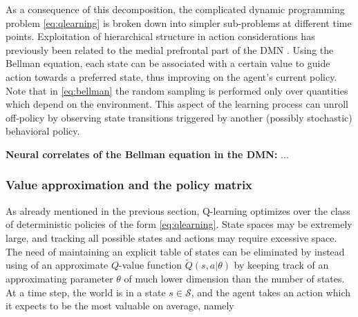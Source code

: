 \documentclass[10pt,letterpaper]{article}
\begin{document}
As a consequence of this decomposition, the complicated dynamic programming
problem \eqref{eq:qlearning}
is broken down into simpler sub-problems at different time points.
Exploitation of hierarchical structure in action considerations
has previously been related to the medial prefrontal part of the DMN
\citep{koechlin1999role, braver2002role}.
Using the Bellman equation, each state can be associated with a certain value
to guide action towards a preferred state, thus improving on the agent's current policy.
Note that in \eqref{eq:bellman} the random sampling
is performed only over quantities which
depend on the environment.
This aspect of the learning process
can unroll off-policy by observing state transitions
triggered by another (possibly stochastic) behavioral policy.

\begin{mdframed}
  \textbf{ Neural correlates of the Bellman equation in the DMN:}
  ...
\end{mdframed}

\subsubsection{Value approximation and the policy matrix}
As already mentioned in the previous section, Q-learning optimizes over the class of
deterministic policies of the form \eqref{eq:qlearning}. State spaces may be extremely large,
and tracking all possible states and actions may require excessive space.
The need of maintaining an explicit table of
states can be eliminated by instead using of an approximate $Q$-value function $\tilde{Q}(s,a|\theta)$
by keeping track of an approximating parameter $\theta$ of much lower dimension than the number of states.
At a time step, the world is in a state $s \in \mathcal S$, and the agent takes an
action which it expects to be the most valuable on average, namely
\end{document}
